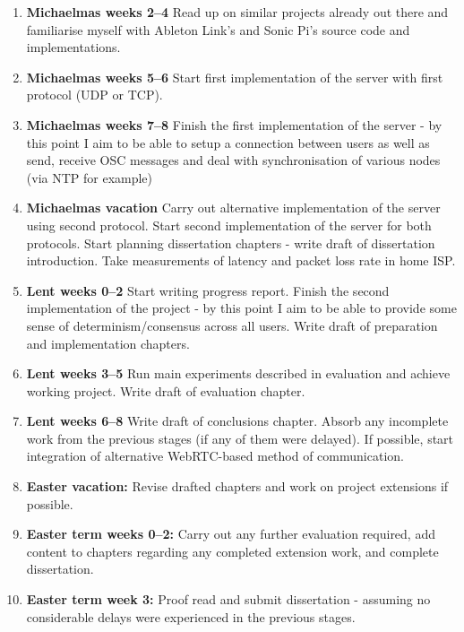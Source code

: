 \documentclass[12pt,a4paper,twoside]{article}
\begin{document}
\begin{enumerate}

\item \textbf{Michaelmas weeks 2--4} Read up on similar projects already out there and familiarise myself with Ableton Link's and Sonic Pi's source code and implementations.

\item \textbf{Michaelmas weeks 5--6} Start first implementation of the server with first protocol (UDP or TCP).

\item \textbf{Michaelmas weeks 7--8} Finish the first implementation of the server - by this point I aim to be able to setup a connection between users as well as send, receive OSC messages and deal with synchronisation of various nodes (via NTP for example)

\item \textbf{Michaelmas vacation} Carry out alternative implementation of the server using second protocol. Start second implementation of the server for both protocols. Start planning dissertation chapters - write draft of dissertation introduction. Take measurements of latency and packet loss rate in home ISP.

\item \textbf{Lent weeks 0--2} Start writing progress report. Finish the second implementation of the project - by this point I aim to be able to provide some sense of determinism/consensus across all users. Write draft of preparation and implementation chapters.

\item \textbf{Lent weeks 3--5} Run main experiments described in evaluation and achieve working project. Write draft of evaluation chapter.

\item \textbf{Lent weeks 6--8} Write draft of conclusions chapter. Absorb any incomplete work from the previous stages (if any of them were delayed). If possible, start integration of alternative WebRTC-based method of communication.

\item \textbf{Easter vacation:} Revise drafted chapters and work on project extensions if possible.

\item \textbf{Easter term weeks 0--2:}  Carry out any further evaluation required, add content to chapters regarding any completed extension work, and complete dissertation.

\item \textbf{Easter term week 3:} Proof read and submit dissertation - assuming no considerable delays were experienced in the previous stages.

\end{enumerate}
\end{document}
